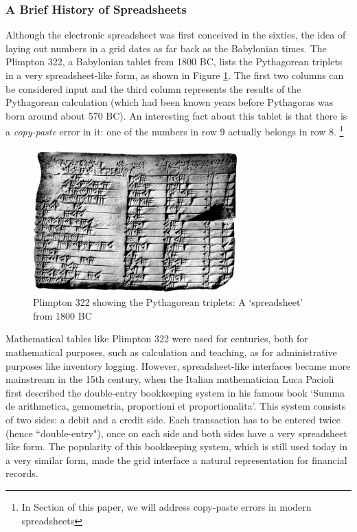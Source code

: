 \subsubsection{A Brief History of Spreadsheets}

Although the electronic spreadsheet was first conceived in the sixties, the idea of laying out numbers in a grid dates as far back as the Babylonian times. The Plimpton 322, a Babylonian tablet from 1800 BC, lists the Pythagorean triplets in a very spreadsheet-like form, as shown in Figure \ref{fig:Plimpton}. The first two columns can be considered input and the third column represents the results of the Pythagorean calculation (which had been known years before Pythagoras was born around about 570 BC). An interesting fact about this tablet is that there is a \emph{copy-paste} error in it: one of the numbers in row 9 actually belongs in row 8. \footnote{In Section  of this paper, we will address copy-paste errors in modern spreadsheets}

\begin{figure}
  \begin{center}
  \includegraphics[width=8cm]{fig/Plimpton.png}
  \caption{Plimpton 322 showing the Pythagorean triplets: A ‘spreadsheet’ from 1800 BC}
  \label{fig:Plimpton}
  \end{center}
\end{figure} 

Mathematical tables like Plimpton 322 were used for centuries, both for mathematical purposes, such as calculation and teaching, as for administrative purposes like inventory logging. However, spreadsheet-like interfaces became more mainstream in the 15th century, when the Italian mathematician Luca Pacioli first described the double-entry bookkeeping system in his famous book `Summa de arithmetica, gemometria, proportioni et proportionalita'. This system consists of two sides: a debit and a credit side. Each transaction has to be entered twice (hence ``double-entry"), once on each side and both sides have a very spreadsheet like form. The popularity of this bookkeeping system, which is still used today in a very similar form, made the grid interface a natural representation for financial records.

